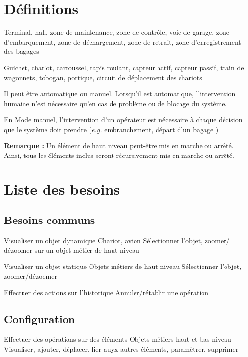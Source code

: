 \section{Définitions}
{Terminal, hall,  zone de maintenance, zone de contrôle, voie de garage, zone d'embarquement, zone de déchargement, zone de retrait, zone d'enregistrement des bagages}


{Guichet, chariot, carroussel, tapis roulant, capteur actif, capteur passif,  train de wagonnets, tobogan, portique, circuit de déplacement des chariots}


{
Il peut être automatique ou manuel. Lorsqu'il est automatique, l'intervention humaine n'est nécessaire qu'en cas de problème ou de blocage du système.

En Mode manuel, l'intervention d'un opérateur est nécessaire à chaque décision que le système doit prendre (\textsl{e.g.} embranchement, départ d'un bagage )
}

\textbf{Remarque :} Un élément de haut niveau peut-être mis en marche ou arrêté. Ainsi, tous les éléments inclus seront récursivement mis en marche ou arrêté.

\section{Liste des besoins}
\subsection{Besoins communs}
\nBesoin
{Visualiser un objet dynamique}
{Chariot, avion}
{Sélectionner l'objet, zoomer/ dézoomer sur un objet métier de haut niveau}

\nBesoin
{Visualiser un objet statique}
{Objets métiers de haut niveau}
{Sélectionner l'objet, zoomer/dézoomer}

\nBesoin
{Effectuer des actions sur l'historique}
{}
{Annuler/rétablir une opération}

\subsection{Configuration}
\setcounter{cntBesoins}{1}

\nBesoin
{Effectuer des opérations sur des éléments}
{Objets métiers haut et bas niveau}
{Visualiser, ajouter, déplacer, lier auyx autres éléments, paramètrer, supprimer}

